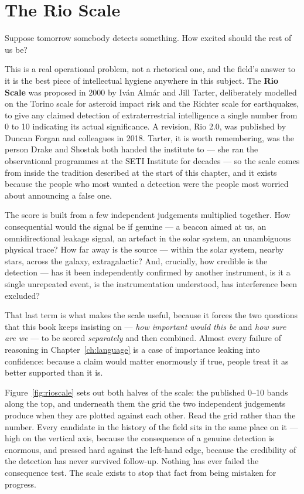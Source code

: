 \section{The Rio Scale}\label{sec:rio}

Suppose tomorrow somebody detects something. How excited should the rest of us be?

This is a real operational problem, not a rhetorical one, and the field's answer to it is the best
piece of intellectual hygiene anywhere in this subject. The \textbf{Rio Scale} was proposed in 2000
by Iv\'an Almár and Jill Tarter, deliberately modelled on the Torino scale for asteroid impact risk
and the Richter scale for earthquakes, to give any claimed detection of extraterrestrial intelligence
a single number from 0 to 10 indicating its actual significance. A revision, Rio 2.0, was published
by Duncan Forgan and colleagues in 2018. Tarter, it is worth remembering, was the person Drake and
Shostak both handed the institute to --- she ran the observational programmes at the SETI Institute for
decades --- so the scale comes from inside the tradition described at the start of this chapter, and it
exists because the people who most wanted a detection were the people most worried about announcing a
false one.

The score is built from a few independent judgements multiplied together. How consequential would the
signal be if genuine --- a beacon aimed at us, an omnidirectional leakage signal, an artefact in the
solar system, an unambiguous physical trace? How far away is the source --- within the solar system,
nearby stars, across the galaxy, extragalactic? And, crucially, how credible is the detection ---
has it been independently confirmed by another instrument, is it a single unrepeated event, is the
instrumentation understood, has interference been excluded?

That last term is what makes the scale useful, because it forces the two questions that this book
keeps insisting on --- \emph{how important would this be} and \emph{how sure are we} --- to be scored
\emph{separately} and then combined. Almost every failure of reasoning in Chapter~\ref{ch:language}
is a case of importance leaking into confidence: because a claim would matter enormously if true,
people treat it as better supported than it is.

Figure~\ref{fig:rioscale} sets out both halves of the scale: the published 0--10 bands along the
top, and underneath them the grid the two independent judgements produce when they are plotted
against each other. Read the grid rather than the number. Every candidate in the history of the
field sits in the same place on it --- high on the vertical axis, because the consequence of a
genuine detection is enormous, and pressed hard against the left-hand edge, because the credibility
of the detection has never survived follow-up. Nothing has ever failed the consequence test. The
scale exists to stop that fact from being mistaken for progress.

